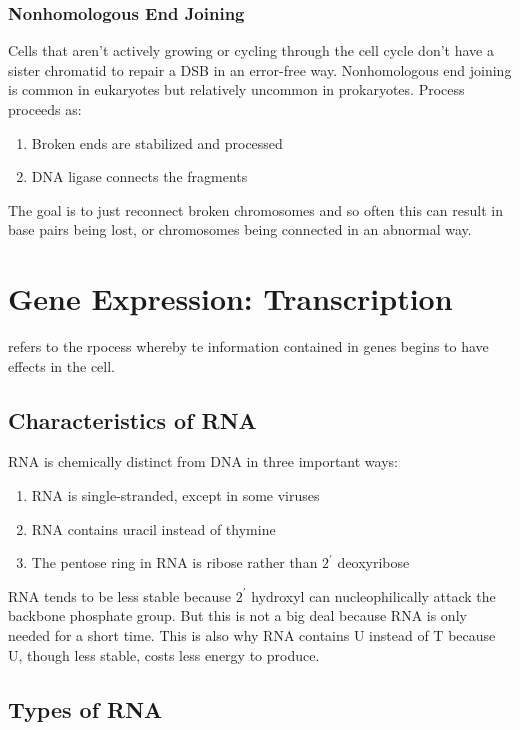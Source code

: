 \documentclass[../Bio_chemistryReview.tex]{subfiles}
\begin{document}
\subsubsection{Nonhomologous End Joining}
Cells that aren't actively growing or cycling through the cell cycle don't have
a sister chromatid to repair a DSB in an error-free way. Nonhomologous end
joining is common in eukaryotes but relatively uncommon in prokaryotes. Process
proceeds as:
\begin{enumerate}
  \item Broken ends are stabilized and processed
  \item DNA ligase connects the fragments
\end{enumerate}
The goal is to just reconnect broken chromosomes and so often this can result in
base pairs being lost, or chromosomes being connected in an abnormal way.

\section{Gene Expression: Transcription}
 refers to the rpocess whereby te information contained
in genes begins to have effects in the cell.

\subsection{Characteristics of RNA}
RNA is chemically distinct from DNA in three important ways:
\begin{enumerate}
  \item RNA is single-stranded, except in some viruses
  \item RNA contains uracil instead of thymine
  \item The pentose ring in RNA is ribose rather than $ 2^{\prime} $ deoxyribose
\end{enumerate}
RNA tends to be less stable because $ 2^{\prime} $ hydroxyl can nucleophilically
attack the backbone phosphate group. But this is not a big deal because RNA is
only needed for a short time. This is also why RNA contains U instead of T
because U, though less stable, costs less energy to produce.

\subsection{Types of RNA}
\end{document}
